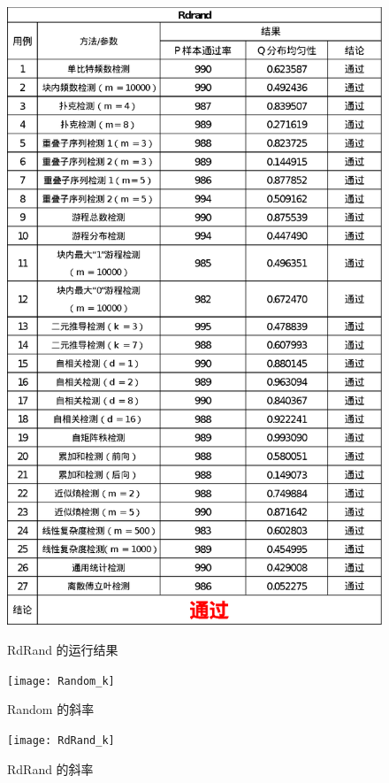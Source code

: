 \documentclass[12pt,a4paper]{article}%
\begin{document}
\begin{figure}[h]
\begin{minipage}{0.42\textwidth}
            \includegraphics[width=\linewidth]{RdRand}
            \caption{RdRand 的运行结果}
            \label{fig:img5}
        \end{minipage}\hfill
        \begin{minipage}{0.42\textwidth}
            \centering
            \texttt{[image: Random\_k]}
            \caption{Random 的斜率}
            \label{fig:img6}
        \end{minipage}\hfill
        \begin{minipage}{0.42\textwidth}
            \centering
            \texttt{[image: RdRand\_k]}
            \caption{RdRand 的斜率}
            \label{fig:img7}
        \end{minipage}
    \end{figure}
\end{document}
